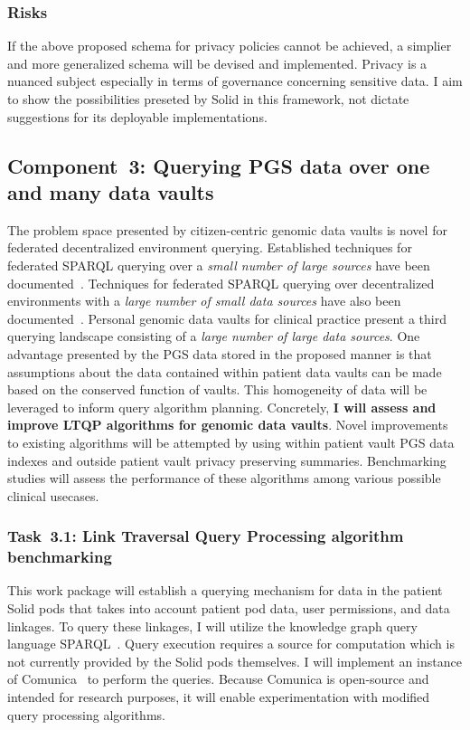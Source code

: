 \documentclass[a4paper,11pt]{article}
\begin{document}
\begin{refsection}
\subsubsection{Risks}
If the above proposed schema for privacy policies cannot be achieved, a simplier and more generalized schema will be devised and implemented.
Privacy is a nuanced subject especially in terms of governance concerning sensitive data. 
I aim to show the possibilities preseted by Solid in this framework, not dictate suggestions for its deployable implementations. 


\newcommand\WPc{Querying PGS data over one and many data vaults}
\subsection{Component~3: \WPc}

The problem space presented by citizen-centric genomic data vaults is novel for federated decentralized environment querying. 
Established techniques for federated SPARQL querying over a \emph{small number of large sources} have been documented~\cite{hibiscus, tpf}.
Techniques for federated SPARQL querying over decentralized environments with a \emph{large number of small data sources} have also been documented~\cite{taelman_LTQP_2023}.
Personal genomic data vaults for clinical practice present a third querying landscape consisting of a \emph{large number of large data sources}.
One advantage presented by the PGS data stored in the proposed manner is that assumptions about the data contained within patient data vaults can be made based on the conserved function of vaults.
This homogeneity of data will be leveraged to inform query algorithm planning.
Concretely, \textbf{I will assess and improve LTQP algorithms for genomic data vaults}.
Novel improvements to existing algorithms will be attempted by using within patient vault PGS data indexes and outside patient vault privacy preserving summaries.
Benchmarking studies will assess the performance of these algorithms among various possible clinical usecases.


\newcommand\WPca{Link Traversal Query Processing algorithm benchmarking}
\subsubsection{Task~3.1: \WPca}

This work package will establish a querying mechanism for data in the patient Solid pods that takes into account patient pod data, user permissions, and data linkages. 
To query these linkages, I will utilize the knowledge graph query language SPARQL~\cite{spec:sparqllang}.
Query execution requires a source for computation which is not currently provided by the Solid pods themselves.
I will implement an instance of Comunica~\cite{comunica} to perform the queries.
Because Comunica is open-source and intended for research purposes, it will enable experimentation with modified query processing algorithms. 


\end{refsection}
\end{document}
